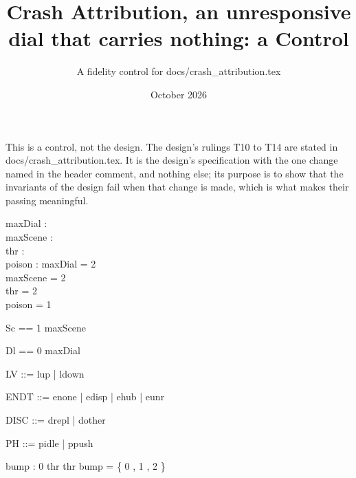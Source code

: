 \documentclass[a4paper,10pt,fleqn]{article}
\begin{document}
\title{Crash Attribution, an unresponsive dial that carries nothing: a Control}
\author{A fidelity control for docs/crash\_attribution.tex}
\date{October 2026}
\maketitle

This is a control, not the design.  The design's rulings T10 to T14 are stated in docs/crash_attribution.tex.  It is the design's
specification with the one change named in the header comment, and nothing
else; its purpose is to show that the invariants of the design fail when
that change is made, which is what makes their passing meaningful.

\begin{axdef}
  maxDial : \nat \\
  maxScene : \nat \\
  thr : \nat \\
  poison : \nat
\where
  maxDial = 2 \\
  maxScene = 2 \\
  thr = 2 \\
  poison = 1
\end{axdef}

\begin{zed}
  Sc == 1 \upto maxScene
\end{zed}

\begin{zed}
  Dl == 0 \upto maxDial
\end{zed}

\begin{zed}
  LV ::= lup | ldown
\end{zed}

\begin{zed}
  ENDT ::= enone | edisp | ehub | eunr
\end{zed}

\begin{zed}
  DISC ::= drepl | dother
\end{zed}

\begin{zed}
  PH ::= pidle | ppush
\end{zed}

\begin{axdef}
  bump : 0 \upto thr  \upto thr
\where
  bump = \{ 0 , 1 , 2  \}
\end{axdef}
\end{document}
